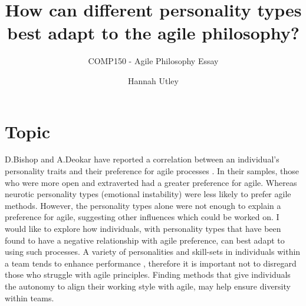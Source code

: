 \documentclass{scrartcl}
\title{How can different personality types best adapt to the agile philosophy?}
\subtitle{COMP150 - Agile Philosophy Essay}
\author{Hannah Utley}
\begin{document}
\maketitle

\section*{Topic}

D.Bishop and A.Deokar have reported a correlation between an individual’s personality traits and their preference for agile processes \cite{Paper1}. In their samples, those who were more open and extraverted had a greater preference for agile. Whereas neurotic personality types (emotional instability) were less likely to prefer agile methods. However, the personality types alone were not enough to explain a preference for agile, suggesting other influences which could be worked on. I would like to explore how individuals, with personality types that have been found to have a negative relationship with agile preference, can best adapt to using such processes. A variety of personalities and skill-sets in individuals within a team tends to enhance performance \cite{Paper3}, therefore it is important not to disregard those who struggle with agile principles. Finding methods that give individuals the autonomy to align their working style with agile, may help ensure diversity within teams.
\end{document}
